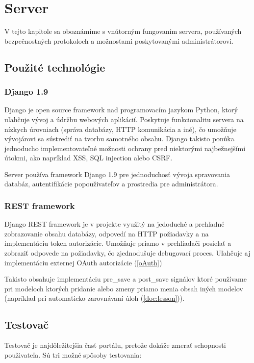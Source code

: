 \chapter{Server}

\label{kap:server}

V tejto kapitole sa oboznámime s vnútorným fungovaním servera, používaných bezpečnostných protokoloch
a možnosťami poskytovanými administrátorovi.

\section{Použité technológie}

\subsection{Django 1.9}
Django je open source framework nad programovacím jazykom Python, ktorý uľahčuje vývoj a údržbu webových aplikácií.
Poskytuje funkcionalitu servera na nízkych úrovniach (správa databázy, HTTP komunikácia a iné), čo umožňuje vývojárovi sa sústrediť na tvorbu samotného obsahu.
Django takisto ponúka jednoducho implementovateľné možnosti ochrany pred niektorými najbežnejšími útokmi, ako napríklad XSS, SQL injection alebo CSRF.

Server používa framework Django 1.9 pre jednoduchosť vývoja spravovania databáz, autentifikácie popouživateľov a prostredia pre administrátora.
\subsection{REST framework}
Django REST framework je v projekte využitý na jedoduché a prehľadné zobrazovanie obsahu databázy, odpovedí na HTTP požiadavky a na implementáciu
token autorizácie. Umožňuje priamo v prehliadači posielať a zobraziť odpovede na požiadavky, čo zjednodušuje debugovací proces. Uľahčuje aj implementáciu externej OAuth
autorizácie (\ref{oAuth})

Takisto obsahuje implementáciu pre\_save a post\_save signálov ktoré používame pri
modeloch ktorých pridanie alebo zmeny priamo menia obsah iných modelov
(napríklad pri automaticko zarovnávaní úloh (\ref{doc:lesson})).
\newpage
\section{Testovač}
\label{testovace}
Testovač je najdôležitejšia časť portálu, pretože dokáže zmerať schopnosti použivateľa. Sú tri možné spôsoby testovania:
